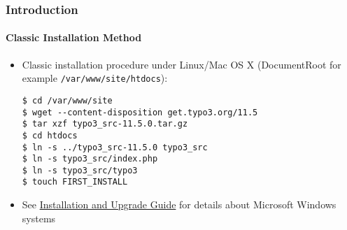 %

\begin{frame}[fragile]
	\frametitle{Introduction}
	\framesubtitle{Classic Installation Method}


	\begin{itemize}
		\item Classic installation procedure under Linux/Mac OS X\newline
			(DocumentRoot for example \texttt{/var/www/site/htdocs}):
\begin{lstlisting}
$ cd /var/www/site
$ wget --content-disposition get.typo3.org/11.5
$ tar xzf typo3_src-11.5.0.tar.gz
$ cd htdocs
$ ln -s ../typo3_src-11.5.0 typo3_src
$ ln -s typo3_src/index.php
$ ln -s typo3_src/typo3
$ touch FIRST_INSTALL
\end{lstlisting}

		\item See \href{https://docs.typo3.org/m/typo3/guide-installation/master/en-us/}{Installation and Upgrade Guide}
			for details about Microsoft Windows systems

	\end{itemize}
\end{frame}

